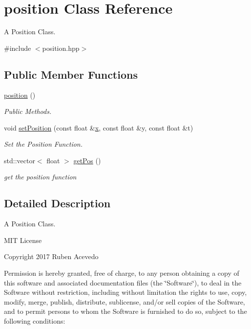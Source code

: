 \hypertarget{classposition}{}\section{position Class Reference}
\label{classposition}


A Position Class.  




{\ttfamily \#include $<$position.\+hpp$>$}

\subsection*{Public Member Functions}
\begin{DoxyCompactItemize}
\item 
\hyperlink{classposition_a0492eb9ae0eee02f191f02e229af24d1}{position} ()
\begin{DoxyCompactList}\small\item\em Public Methods. \end{DoxyCompactList}\item 
void \hyperlink{classposition_a64903875492810b4c4a8f0577406e620}{set\+Position} (const float \&\hyperlink{nodeInteractionsTest_8cpp_ad0da36b2558901e21e7a30f6c227a45e}{x}, const float \&y, const float \&t)
\begin{DoxyCompactList}\small\item\em Set the Position Function. \end{DoxyCompactList}\item 
std\+::vector$<$ float $>$ \hyperlink{classposition_a8c7fc88bef973ae597d039e14908c9c3}{get\+Pos} ()
\begin{DoxyCompactList}\small\item\em get the position function \end{DoxyCompactList}\end{DoxyCompactItemize}


\subsection{Detailed Description}
A Position Class. 

M\+IT License

Copyright 2017 Ruben Acevedo

Permission is hereby granted, free of charge, to any person obtaining a copy of this software and associated documentation files (the \char`\"{}\+Software\char`\"{}), to deal in the Software without restriction, including without limitation the rights to use, copy, modify, merge, publish, distribute, sublicense, and/or sell copies of the Software, and to permit persons to whom the Software is furnished to do so, subject to the following conditions\+:


